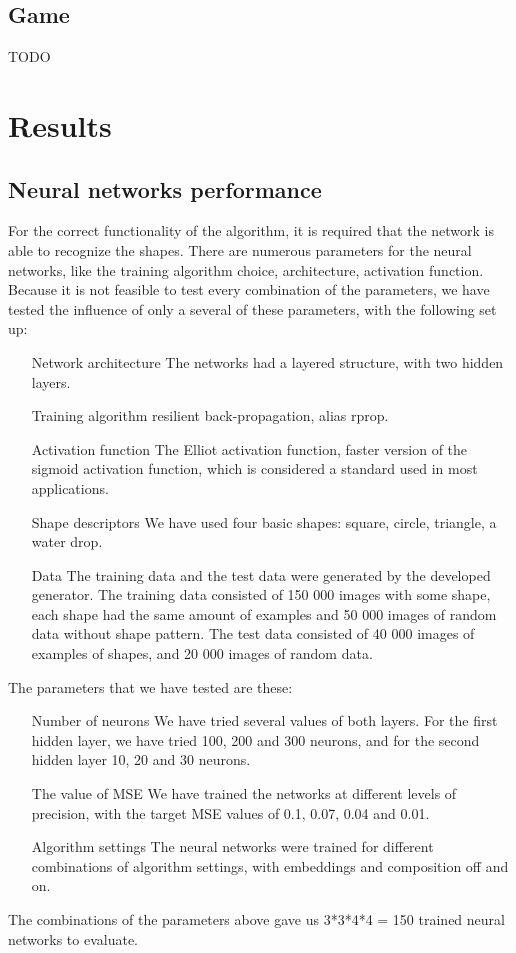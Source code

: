 \begin{description}
\section{Game}
TODO

\chapter{Results}

\section{Neural networks performance}
For the correct functionality of the algorithm, it is required that the network is able to recognize the shapes. There are numerous parameters for the neural networks, like the training algorithm choice, architecture, activation function. Because it is not feasible to test every combination of the parameters, we have tested the influence of only a several of these parameters, with the following set up:
\begin{enumerate}
\item [Network architecture] The networks had a layered structure, with two hidden layers.
\item [Training algorithm] resilient back-propagation, alias rprop.
\item [Activation function] The Elliot activation function, faster version of the sigmoid activation function, which is considered a standard used in most applications.
\item [Shape descriptors] We have used four basic shapes: square, circle, triangle, a water drop. 
\item [Data] The training data and the test data were generated by the developed generator. The training data consisted of 150 000 images with some shape, each shape had the same amount of examples and 50 000 images of random data without shape pattern. The test data consisted of 40 000 images of examples of shapes, and 20 000 images of random data.
\end{enumerate}

The parameters that we have tested are these:
\begin{enumerate}
\item [Number of neurons] We have tried several values of both layers. For the first hidden layer, we have tried 100, 200 and 300 neurons, and for the second hidden layer 10, 20 and 30 neurons. 
\item [The value of MSE] We have trained the networks at different levels of precision, with the target MSE values of 0.1, 0.07, 0.04 and 0.01.   
\item [Algorithm settings] The neural networks were trained for different combinations of algorithm settings, with embeddings and composition off and on.
\end{enumerate}
The combinations of the parameters above gave us 3*3*4*4 = 150 trained neural networks to evaluate.


\end{description}
